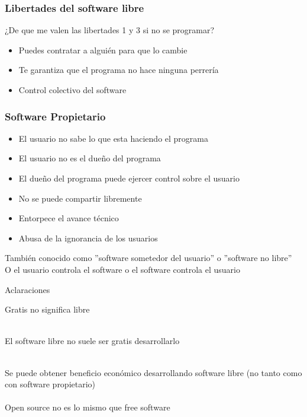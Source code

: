\documentclass{beamer}
\begin{document}
\begin{frame}\frametitle{Libertades del software libre}

    \begin{block}{¿De que me valen las libertades 1 y 3 si no se programar?} \pause
        \begin{itemize}
            \item Puedes contratar a alguién para que lo cambie \pause
            \item Te garantiza que el programa no hace ninguna perrería \pause
            \item Control colectivo del software
        \end{itemize}
    \end{block}
\end{frame}

\begin{frame}\frametitle{Software Propietario}

    \begin{itemize}
        \item El usuario no sabe lo que esta haciendo el programa \pause
        \item El usuario no es el dueño del programa \pause
        \item El dueño del programa puede ejercer control sobre el usuario \pause
        \item No se puede compartir libremente \pause
        \item Entorpece el avance técnico \pause
        \item Abusa de la ignorancia de los usuarios
    \end{itemize}

    También conocido como ''software sometedor del usuario'' o ''software no
    libre'' \pause
    \\
    O el usuario controla el software o el software controla el usuario \pause

\end{frame}


\begin{frame}{Aclaraciones}
    \begin{center}
        Gratis no significa libre     \\~\\ \pause

        El software libre no suele ser gratis desarrollarlo\\~\\ \pause

        Se puede obtener beneficio económico desarrollando software libre
        (no tanto como con software propietario) \pause
        \\~\\
        Open source no es lo mismo que free software \pause
    \end{center}
\end{frame}
\end{document}
